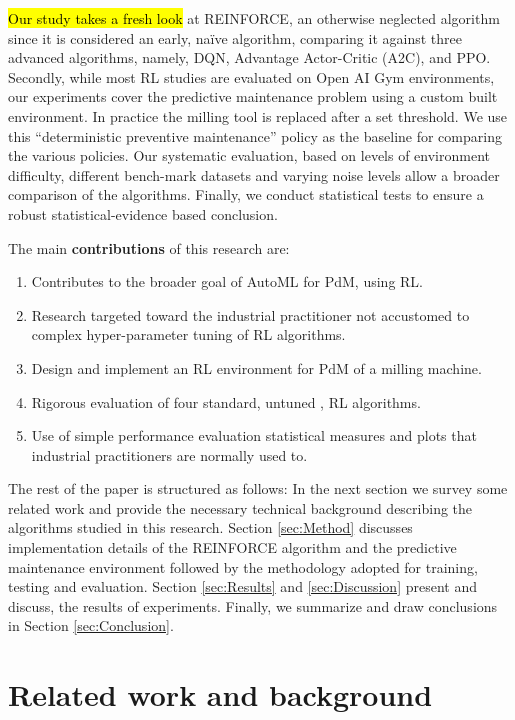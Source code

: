 \documentclass[a4paper, 12pt]{article}
\newcommand{\hlc}[2][cyan!7]{{\colorlet{foo}{#1} \sethlcolor{foo}\hl{#2}}}
\begin{document}
\hlc{Our study takes a fresh look} at REINFORCE, an otherwise neglected algorithm since it is considered an early, na\"ive algorithm, comparing it against three advanced algorithms, namely, DQN, Advantage Actor-Critic (A2C), and PPO. Secondly, while most RL studies are evaluated on Open AI Gym environments, our experiments cover the predictive maintenance problem using a custom built environment. In practice the milling tool is replaced after a set threshold. We use this ``deterministic preventive maintenance'' policy as the baseline for comparing the various policies. Our systematic evaluation, based on levels of environment difficulty, different bench-mark datasets and varying noise levels allow a broader comparison of the algorithms. Finally, we conduct statistical tests to ensure a robust statistical-evidence based conclusion.

The main \textbf{contributions} of this research are:
\begin{enumerate}
	\item Contributes to the broader goal of AutoML for PdM, using RL.
	\item Research targeted toward the industrial practitioner not accustomed to complex hyper-parameter tuning of RL algorithms.
	\item Design and implement an RL environment for PdM of a milling machine.
	\item Rigorous evaluation of four standard, untuned , RL algorithms.
	\item Use of simple performance evaluation statistical measures and plots that industrial practitioners are normally used to.
\end{enumerate} 

The rest of the paper is structured as follows: In the next section we survey some related work and provide the necessary technical background describing the algorithms studied in this research. Section \ref{sec:Method} discusses implementation details of the REINFORCE algorithm and the predictive maintenance environment followed by the methodology adopted for training, testing and evaluation. Section \ref{sec:Results} and \ref{sec:Discussion} present and discuss, the results of experiments. Finally, we summarize and draw conclusions in Section \ref{sec:Conclusion}.

\section{Related work and background}\label{sec:SLR}
\end{document}

